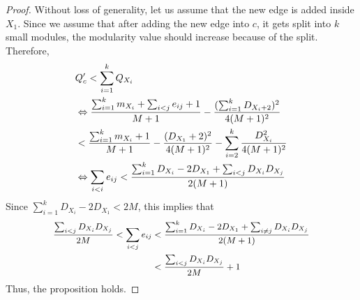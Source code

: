 \begin{proof}
 Without loss of generality, let us assume that the new edge is added inside $X_1$. 
Since we assume that after adding the new edge into $c$, it gets split into $k$ small modules, the modularity value should increase because of the split. Therefore, %
\[
\begin{split}\small
& Q'_c < \sum_{i=1}^k Q_{X_i}\\
& \Leftrightarrow \frac{\sum_{i=1}^k m_{X_i} + \sum_{i<j} e_{ij} + 1}{M+1} - \frac{(\sum_{i=1}^k D_{X_i +2})^2}{4(M+1)^2}\\
& < \frac{\sum_{i=1}^k m_{X_i}+1}{M+1} - \frac{(D_{X_1}+2)^2}{4(M+1)^2} - \sum_{i=2}^k \frac{D_{X_i}^2}{4(M+1)^2}\\
&\Leftrightarrow \sum_{i<i} e_{ij} < \frac{\sum_{i=1}^k D_{X_i} - 2 D_{X_1} + \sum_{i<j} D_{X_i}D_{X_j}}{2(M+1)}
\end{split}
\]
Since $\sum_{i=1}^k D_{X_i} - 2D_{X_1} < 2M$, this implies that 
\[\small
\begin{split}
\frac{\sum_{i<j}D_{X_i}D_{X_j}}{2M}  < \sum_{i<j}e_{ij} 
&< \frac{\sum_{i=1}^k D_{X_i} - 2D_{X_1} + \sum_{i\neq j}{D_{X_i}D_{X_j}}}{2(M+1)}\\
& <\frac{\sum_{i<j}D_{X_i}D_{X_j}}{2M}+1
\end{split}
\]
Thus, the proposition holds.
\end{proof}



